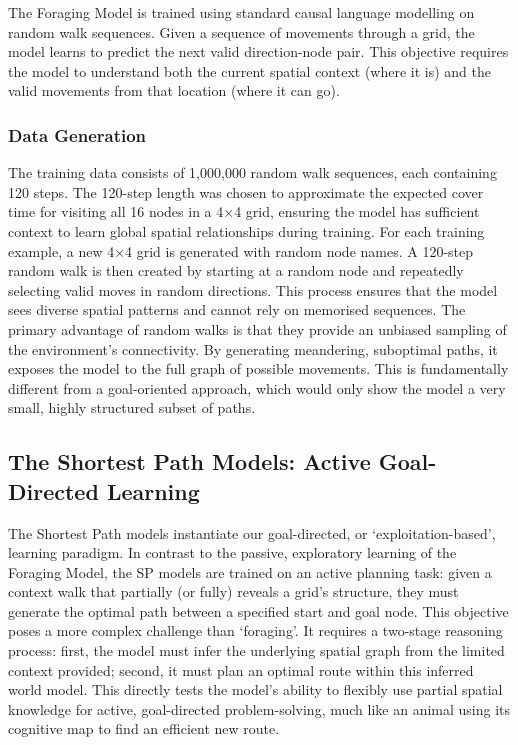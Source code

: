 The Foraging Model is trained using standard causal language modelling on random walk sequences. Given a sequence of movements through a grid, the model learns to predict the next valid direction-node pair. This objective requires the model to understand both the current spatial context (where it is) and the valid movements from that location (where it can go). 

\subsubsection*{Data Generation}

The training data consists of 1,000,000 random walk sequences, each containing 120 steps. The 120-step length was chosen to approximate the expected cover time for visiting all 16 nodes in a 4×4 grid, ensuring the model has sufficient context to learn global spatial relationships during training.  For each training example, a new 4×4 grid is generated with random node names. A 120-step random walk is then created by starting at a random node and repeatedly selecting valid moves in random directions. This process ensures that the model sees diverse spatial patterns and cannot rely on memorised sequences. The primary advantage of random walks is that they provide an unbiased sampling of the environment’s connectivity. By generating meandering, suboptimal paths, it exposes the model to the full graph of possible movements. This is fundamentally different from a goal-oriented approach, which would only show the model a very small, highly structured subset of paths.

\subsection{The Shortest Path Models: Active Goal-Directed Learning}

The Shortest Path models instantiate our goal-directed, or `exploitation-based', learning paradigm. In contrast to the passive, exploratory learning of the Foraging Model, the SP models are trained on an active planning task: given a context walk that partially (or fully) reveals a grid's structure, they must generate the optimal path between a specified start and goal node. This objective poses a more complex challenge than `foraging'. It requires a two-stage reasoning process: first, the model must infer the underlying spatial graph from the limited context provided; second, it must plan an optimal route within this inferred world model. This directly tests the model's ability to flexibly use partial spatial knowledge for active, goal-directed problem-solving, much like an animal using its cognitive map to find an efficient new route.

